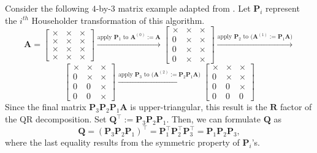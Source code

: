 \documentclass[review,onefignum,onetabnum]{siamart190516}
\newcommand{\bb}[1]{\mathbf{#1}}
\begin{document}
Consider the following $4$-by-$3$ matrix example adapted from \cite{Higham2002}. 
Let $\bb{P}_i$ represent the $i^{th}$ Householder transformation of this algorithm. 
\[\bb{A} = \left[ \begin{array}{ccc}
\times & \times & \times \\
\times & \times & \times \\
\times & \times & \times \\
\times & \times & \times
\end{array}
\right]\xrightarrow{\text{apply $\bb{P}_1$ to $\bb{A}^{(0)}:=\bb{A}$}}\left[ \begin{array}{c|cc}
\times & \times & \times \\ \hline
0 & \times & \times \\
0 & \times & \times \\
0 & \times & \times
\end{array}
\right]
\xrightarrow{\text{apply $\bb{P}_2$ to ($\bb{A}^{(1)}:=\bb{P}_1\bb{A}$)}}\]
\[ \left[
\begin{array}{cc|c}
\times & \times & \times \\
0 & \times & \times \\ \hline
0 & 0 & \times \\
0 & 0 & \times 
\end{array} \right]
\xrightarrow{\text{apply $\bb{P}_3$ to ($\bb{A}^{(2)}:=\bb{P}_2\bb{P}_1\bb{A}$)}} \left[ \begin{array}{ccc}
\times & \times & \times \\
0 & \times & \times \\
0 & 0 & \times \\
0 & 0 & 0 
\end{array}\right] \] 
Since the final matrix $ \bb{P}_3\bb{P}_2\bb{P}_1\bb{A}$ is upper-triangular, this result is the $\bb{R}$ factor of the QR decomposition.
Set $\bb{Q}^{\top}:=\bb{P}_3\bb{P}_2\bb{P}_1$. 
Then, we can formulate  $\bb{Q}$ as
$$
\bb{Q} = (\bb{P}_3\bb{P}_2\bb{P}_1)^{\top} = \bb{P}_1^{\top}\bb{P}_2^{\top}\bb{P}_3^{\top} = \bb{P}_1\bb{P}_2\bb{P}_3,
$$
where the last equality results from the symmetric property of $\bb{P}_i$'s. 
\end{document}
